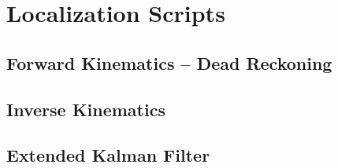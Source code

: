 \chapter{Localization Scripts}

\section{Forward Kinematics -- Dead Reckoning}


\section{Inverse Kinematics}


\section{Extended Kalman Filter}

